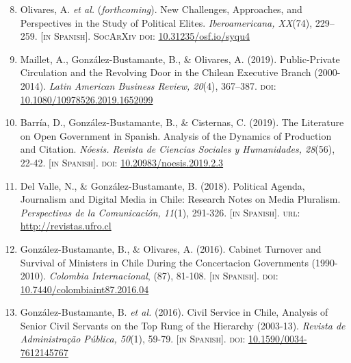 \documentclass[letterpaper,margin]{res}
\newenvironment{benumerate}[1]{
    \let\oldItem\item
    \def\item{\addtocounter{enumi}{-2}\oldItem}
    \begin{enumerate}
    \setcounter{enumi}{#1}
    \addtocounter{enumi}{1}
}{
    \end{enumerate}
}
\begin{document}
\begin{resume}
\begin{benumerate}{7}
\item{\small Olivares, A. {\itshape et al.} ({\itshape forthcoming}). New Challenges, Approaches, and Perspectives in the Study of Political Elites. {\itshape Iberoamericana, XX}(74), 229--259. {\footnotesize \scshape [in Spanish]}. {\scshape {\footnotesize SocArXiv} doi}: \href{https://doi.org/10.31235/osf.io/syqu4}{10.31235/osf.io/syqu4}}\vspace{1mm}

\item{\small Maillet, A., Gonz\'alez-Bustamante, B., \& Olivares, A. (2019). Public-Private Circulation and the Revolving Door in the Chilean Executive Branch (2000-2014). {\itshape Latin American Business Review, 20}(4), 367--387. {\scshape doi}: \href{https://doi.org/10.1080/10978526.2019.1652099}{10.1080/10978526.2019.1652099}}\vspace{1mm}

\item{\small Barr\'ia, D., Gonz\'alez-Bustamante, B., \& Cisternas, C. (2019). The Literature on Open Government in Spanish. Analysis of the Dynamics of Production and Citation. {\itshape N\'oesis. Revista de Ciencias Sociales y Humanidades, 28}(56), 22-42. {\footnotesize \scshape [in Spanish]}. {\scshape doi}: \href{http://dx.doi.org/10.20983/noesis.2019.2.3}{10.20983/noesis.2019.2.3}}\vspace{1mm}

\item{\small Del Valle, N., \& Gonz\'alez-Bustamante, B. (2018). Political Agenda, Journalism and Digital Media in Chile: Research Notes on Media Pluralism. {\itshape Perspectivas de la Comunicaci\'on, 11}(1), 291-326. {\footnotesize \scshape [in Spanish]}. {\scshape url}: \href{http://revistas.ufro.cl/ojs/index.php/perspectivas/article/view/1146}{http://revistas.ufro.cl}}\vspace{1mm}

\item{\small Gonz\'alez-Bustamante, B., \& Olivares, A. (2016). Cabinet Turnover and Survival of Ministers in Chile During the Concertacion Governments (1990-2010). {\itshape Colombia Internacional}, (87), 81-108. {\footnotesize \scshape [in Spanish]}. {\scshape doi}: \href{https://doi.org/10.7440/colombiaint87.2016.04}{10.7440/colombiaint87.2016.04}}\vspace{0.9mm}

\item{\small Gonz\'alez-Bustamante, B. {\itshape et al.} (2016). Civil Service in Chile, Analysis of Senior Civil Servants on the Top Rung of the Hierarchy (2003-13). {\itshape Revista de Administra\c{c}\~ao P\'ublica, 50}(1), 59-79. {\footnotesize \scshape [in Spanish]}. {\scshape doi}: \href{http://dx.doi.org/10.1590/0034-7612145767}{10.1590/0034-7612145767}}\vspace{1mm}


\end{benumerate}
\end{resume}
\end{document}

